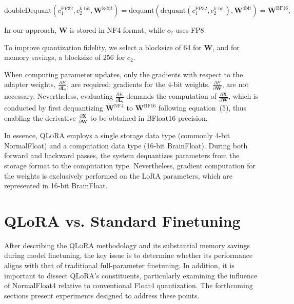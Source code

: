 \begin{equation}
    \text{doubleDequant}(c_1^{\text{FP32}}, c_2^{\text{k-bit}}, \mathbf{W}^{\text{k-bit}}) = \text{dequant}(\text{dequant}(c_1^{\text{FP32}}, c_2^{\text{k-bit}}), \mathbf{W}^{\text{4bit}}) = \mathbf{W}^{\text{BF16}},
\end{equation}

In our approach, $\mathbf{W}$ is stored in NF4 format, while $c_2$ uses FP8.

To improve quantization fidelity, we select a blocksize of 64 for $\mathbf{W}$, and for memory savings, a blocksize of 256 for $c_2$.

When computing parameter updates, only the gradients with respect to the adapter weights, $\frac{\partial E}{\partial \mathbf{L}_i}$, are required; gradients for the 4-bit weights, $\frac{\partial E}{\partial \mathbf{W}}$, are not necessary. Nevertheless, evaluating $\frac{\partial E}{\partial \mathbf{L}_i}$ demands the computation of $\frac{\partial \mathbf{X}}{\partial \mathbf{W}}$, which is conducted by first dequantizing $\mathbf{W}^{\text{NF4}}$ to $\mathbf{W}^{\text{BF16}}$ following equation~(5), thus enabling the derivative $\frac{\partial \mathbf{X}}{\partial \mathbf{W}}$ to be obtained in BFloat16 precision.

In essence, \textsc{QLoRA} employs a single storage data type (commonly 4-bit NormalFloat) and a computation data type (16-bit BrainFloat). During both forward and backward passes, the system dequantizes parameters from the storage format to the computation type. Nevertheless, gradient computation for the weights is exclusively performed on the LoRA parameters, which are represented in 16-bit BrainFloat.

\section{QLoRA vs. Standard Finetuning}
\label{sec:comp_to_std}

After describing the \textsc{QLoRA} methodology and its substantial memory savings during model finetuning, the key issue is to determine whether its performance aligns with that of traditional full-parameter finetuning. In addition, it is important to dissect QLoRA’s constituents, particularly examining the influence of NormalFloat4 relative to conventional Float4 quantization. The forthcoming sections present experiments designed to address these points.

